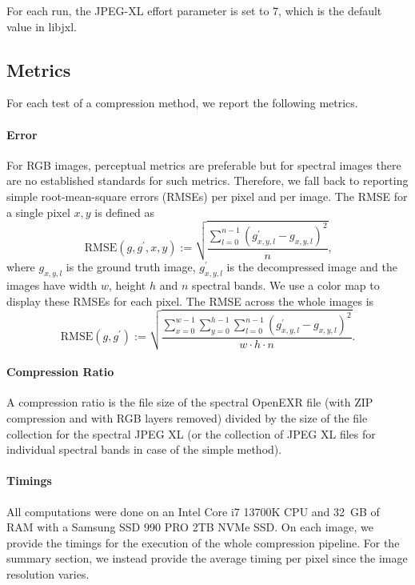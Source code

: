 For each run, the JPEG-XL effort parameter is set to 7, which is the default value in libjxl.


\subsection{Metrics}

For each test of a compression method, we report the following metrics.

\paragraph{Error}

For RGB images, perceptual metrics are preferable but for spectral images there are no established standards for such metrics.
Therefore, we fall back to reporting simple root-mean-square errors (RMSEs) per pixel and per image.
The RMSE for a single pixel $x,y$ is defined as
\begin{equation}
    \mathrm{RMSE}(g,g^{\prime},x,y):=\sqrt{\frac{\sum_{l=0}^{n-1}(g_{x,y,l}^{\prime}-g_{x,y,l})^{2}}{n}} \text{,}
\end{equation}
where $g_{x,y,l}$ is the ground truth image, $g^\prime_{x,y,l}$ is the decompressed image and the images have width $w$, height $h$ and $n$ spectral bands.
We use a color map to display these RMSEs for each pixel.
The RMSE across the whole images is
\begin{equation}
    \mathrm{RMSE}(g,g^{\prime}):=\sqrt{\frac{\sum_{x=0}^{w-1}\sum_{y=0}^{h-1}\sum_{l=0}^{n-1}(g_{x,y,l}^{\prime}-g_{x,y,l})^{2}}{w\cdot h \cdot n}} \text{.}
\end{equation}


\paragraph{Compression Ratio}

A compression ratio is the file size of the spectral OpenEXR file (with ZIP compression and with RGB layers removed) divided by the size of the file collection for the spectral JPEG XL (or the collection of JPEG XL files for individual spectral bands in case of the simple method).


\paragraph{Timings}

All computations were done on an Intel Core i7 13700K CPU and 32~GB of RAM with a Samsung SSD 990 PRO 2TB NVMe SSD.
On each image, we provide the timings for the execution of the whole compression pipeline.
For the summary section, we instead provide the average timing per pixel since the image resolution varies.


